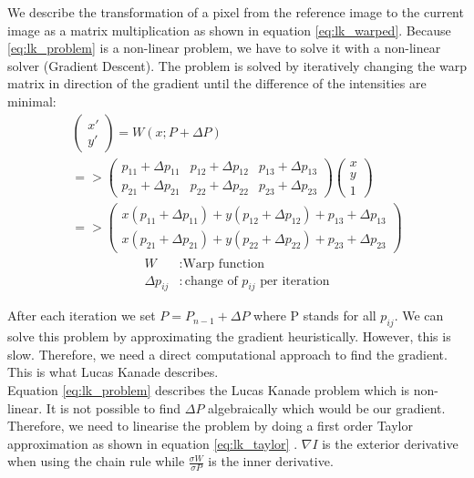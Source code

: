 \documentclass[11pt,a4paper,titlepage,oneside]{report}
\begin{document}
We describe the transformation of a pixel from the reference image to the current image as a matrix multiplication as shown in equation \ref{eq:lk_warped}. Because \ref{eq:lk_problem} is a non-linear problem, we have to solve it with a non-linear solver (Gradient Descent). The problem is solved by iteratively changing the warp matrix in direction of the gradient until the difference of the intensities are minimal:
\begin{equation}\label{eq:lk_warped}
  \begin{gathered}
    \begin{pmatrix}
      x' \\
      y'
    \end{pmatrix}=
    W(x;P+\Delta P)\\
    =>
    \begin{pmatrix}
      p_{11}+\Delta p_{11} & p_{12}+\Delta p_{12} & p_{13}+\Delta p_{13} \\
      p_{21}+\Delta p_{21} & p_{22}+\Delta p_{22} & p_{23}+\Delta p_{23}
    \end{pmatrix}
    \begin{pmatrix}
      x\\
      y\\
      1
    \end{pmatrix}\\
    =>
    \begin{pmatrix}
      x(p_{11}+\Delta p_{11}) + y(p_{12}+\Delta p_{12}) + p_{13}+\Delta p_{13} \\
      x(p_{21}+\Delta p_{21}) + y(p_{22}+\Delta p_{22}) + p_{23}+\Delta p_{23}
    \end{pmatrix}
  \end{gathered}
\end{equation}
\begin{align*}
  W               &: \text{Warp function}\\
  \Delta p_{ij}   &: \text{change of $p_{ij}$ per iteration}
\end{align*}

After each iteration we set $P=P_{n-1}+\Delta P$ where P stands for all $p_{ij}$. We can solve this problem by approximating the gradient heuristically. However, this is slow. Therefore, we need a direct computational approach to find the gradient. This is what Lucas Kanade describes.\\
Equation \ref{eq:lk_problem} describes the Lucas Kanade problem which is non-linear. It is not possible to find $\Delta P$ algebraically which would be our gradient. Therefore, we need to linearise the problem by doing a first order Taylor approximation as shown in equation \ref{eq:lk_taylor} \cite{taylor_series}. $\nabla I$ is the exterior derivative when using the chain rule while $\frac{\sigma W}{\sigma P}$ is the inner derivative. 
\end{document}
